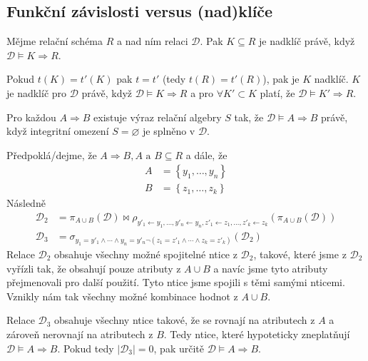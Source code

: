\subsection{Funkční závislosti versus (nad)klíče}
\begin{upquote}
Mějme relační schéma $R$ a nad ním relaci $\mathcal{D}$. Pak $K \subseteq R$ je nadklíč právě, když $\mathcal{D} \vDash K \Rightarrow R$.
\end{upquote}
\begin{upproof}
Pokud $t(K) = t'(K)$ pak $t = t'$ (tedy $t(R) = t'(R)$), pak je $K$ nadklíč.
$K$ je nadklíč pro $\mathcal{D}$ právě, když $\mathcal{D} \vDash K \Rightarrow R$ a pro $\forall K' \subset K$ platí, že $\mathcal{D} \vDash K' \Rightarrow R$.
\end{upproof}
\begin{upquote}
Pro každou $A \Rightarrow B$ existuje výraz relační algebry $S$ tak, že $\mathcal{D} \vDash A \Rightarrow B$ právě, když integritní omezení $S = \varnothing$ je splněno v $\mathcal{D}$.
\end{upquote}
\begin{upproof}
Předpoklá\-/dejme, že $A \Rightarrow B, A \text{ a } B \subseteq R$ a dále, že
\begin{align*}
A &= \left\{ y_{1}, \ldots, y_{n} \right\} \\
B &= \left\{ z_{1}, \ldots, z_{k} \right\}
\end{align*}
Následně
\begin{align*}
\mathcal{D}_{2} &= \pi_{A \cup B} (\mathcal{D}) \Join \rho_{y'_{1} \leftarrow y_{1}, \ldots, y'_{n} \leftarrow y_{n}, z'_{1} \leftarrow z_{1}, \ldots, z'_{k} \leftarrow z_{k}} \left(\pi_{A \cup B} (\mathcal{D})\right) \\
\mathcal{D}_{3} &= \sigma_{y_{1} = y'_{1} \land \cdots \land y_{n} = y'_{n} \lnot(z_{1} = z'_{1} \land \cdots \land z_{k} = z'_{k})} \left( \mathcal{D}_{2} \right)
\end{align*}
Relace $\mathcal{D}_{2}$ obsahuje všechny možné spojitelné ntice z $\mathcal{D}_{2}$, takové, které jsme z $\mathcal{D}_{2}$ vyřízli tak, že obsahují pouze atributy z $A \cup B$ a navíc jsme tyto atributy přejmenovali pro další použití. Tyto ntice jsme spojili s těmi samými nticemi. Vznikly nám tak všechny možné kombinace hodnot z $A \cup B$.

Relace $\mathcal{D}_{3}$ obsahuje všechny ntice takové, že se rovnají na atributech z $A$ a zároveň nerovnají na atributech z $B$. Tedy ntice, které hypoteticky zneplatňují $\mathcal{D} \vDash A \Rightarrow B$. Pokud tedy $|\mathcal{D}_{3}| = 0$, pak určitě $\mathcal{D} \vDash A \Rightarrow B$.

\end{upproof}
